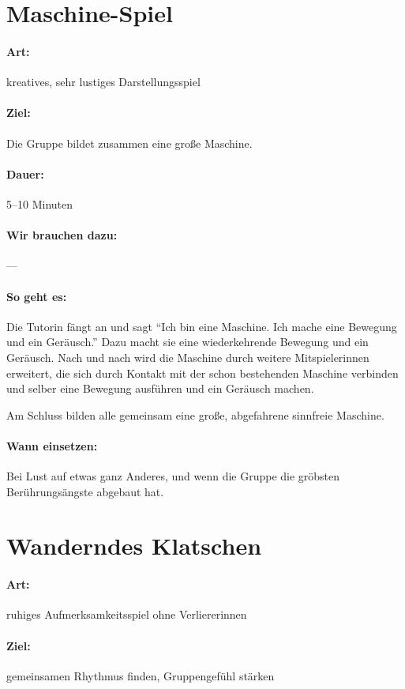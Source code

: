 \section{Maschine-Spiel}
\paragraph{Art:} kreatives, sehr lustiges Darstellungsspiel
\paragraph{Ziel:} Die Gruppe bildet zusammen eine große Maschine.
\paragraph{Dauer:} 5--10 Minuten
\paragraph{Wir brauchen dazu:} ---
\paragraph{So geht es:} Die Tutorin fängt an und sagt "`Ich bin eine Maschine. Ich mache eine Bewegung und ein Geräusch."' Dazu macht sie eine wiederkehrende Bewegung und ein Geräusch. Nach und nach wird die Maschine durch weitere Mitspielerinnen erweitert, die sich durch Kontakt mit der schon bestehenden Maschine verbinden und selber eine Bewegung ausführen und ein Geräusch machen.

Am Schluss bilden alle gemeinsam eine große, abgefahrene sinnfreie Maschine.
\paragraph{Wann einsetzen:} Bei Lust auf etwas ganz Anderes, und wenn die Gruppe die gröbsten Berührungsängste abgebaut hat.

\section{Wanderndes Klatschen}
\paragraph{Art:} ruhiges Aufmerksamkeitsspiel ohne Verliererinnen
\paragraph{Ziel:} gemeinsamen Rhythmus finden, Gruppengefühl stärken
